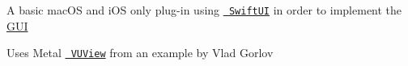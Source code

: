 A basic mac\+OS and i\+OS only plug-\/in using \href{https://developer.apple.com/xcode/swiftui/}{\texttt{ Swift\+UI}} in order to implement the \mbox{\hyperlink{class_g_u_i}{G\+UI}}

Uses Metal \href{https://dev.to/vgorloff/using-swiftui-and-metal-in-audiounit-v3-plug-in-4n07}{\texttt{ V\+U\+View}} from an example by Vlad Gorlov 